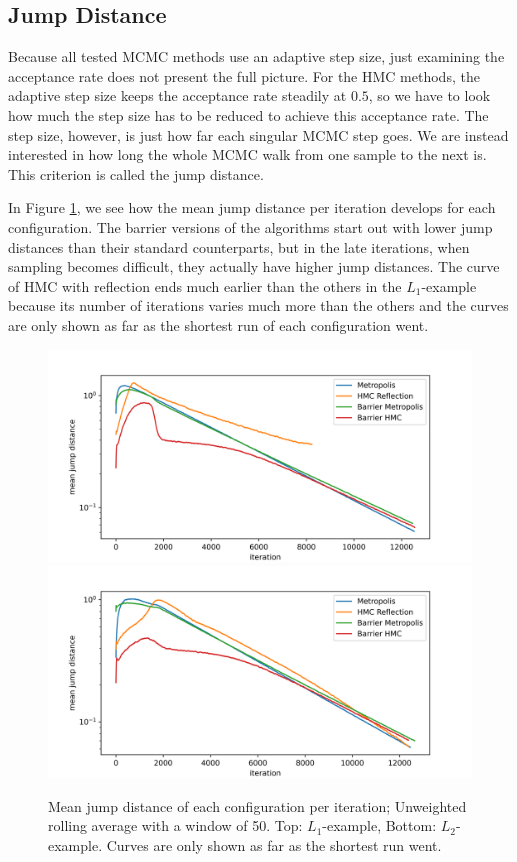 \documentclass[12pt, a4paper]{report}
\begin{document}
\subsection{Jump Distance}
Because all tested MCMC methods use an adaptive step size, just examining the acceptance rate does not present the full picture.
For the HMC methods, the adaptive step size keeps the acceptance rate steadily at $0.5$, so we have to look how much the step size has to be reduced to achieve this acceptance rate.
The step size, however, is just how far each singular MCMC step goes.
We are instead interested in how long the whole MCMC walk from one sample to the next is.
This criterion is called the jump distance.

In Figure \ref{figs:results_jump_distances}, we see how the mean jump distance per iteration develops for each configuration.
The barrier versions of the algorithms start out with lower jump distances than their standard counterparts, but in the late iterations, when sampling becomes difficult, they actually have higher jump distances.
The curve of HMC with reflection ends much earlier than the others in the $L_1$-example because its number of iterations varies much more than the others and the curves are only shown as far as the shortest run of each configuration went.
\begin{figure}
    \centering
    \includegraphics[scale=0.4]{figs/results/mean_jump_distances_spike_20d.png}
    \includegraphics[scale=0.4]{figs/results/mean_jump_distances_spike_offcenter_20d.png}
    \caption{Mean jump distance of each configuration per iteration; Unweighted rolling average with a window of 50. Top: $L_1$-example, Bottom: $L_2$-example. Curves are only shown as far as the shortest run went.}
    \label{figs:results_jump_distances}
\end{figure}
\end{document}
